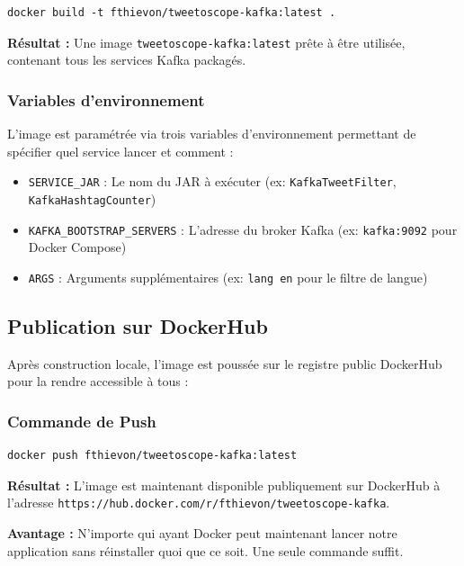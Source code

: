 \documentclass[10pt,a4paper]{article}
\begin{document}
\begin{verbatim}
docker build -t fthievon/tweetoscope-kafka:latest .
\end{verbatim}

\textbf{Résultat :} Une image \texttt{tweetoscope-kafka:latest} prête à être utilisée, contenant tous les services Kafka packagés.

\subsubsection{Variables d'environnement}

L'image est paramétrée via trois variables d'environnement permettant de spécifier quel service lancer et comment :

\begin{itemize}
    \item \texttt{SERVICE\_JAR} : Le nom du JAR à exécuter (ex: \texttt{KafkaTweetFilter}, \texttt{KafkaHashtagCounter})
    \item \texttt{KAFKA\_BOOTSTRAP\_SERVERS} : L'adresse du broker Kafka (ex: \texttt{kafka:9092} pour Docker Compose)
    \item \texttt{ARGS} : Arguments supplémentaires (ex: \texttt{lang en} pour le filtre de langue)
\end{itemize}

\subsection{Publication sur DockerHub}

Après construction locale, l'image est poussée sur le registre public DockerHub pour la rendre accessible à tous :

\subsubsection{Commande de Push}

\begin{verbatim}
docker push fthievon/tweetoscope-kafka:latest
\end{verbatim}

\textbf{Résultat :} L'image est maintenant disponible publiquement sur DockerHub à l'adresse \texttt{https://hub.docker.com/r/fthievon/tweetoscope-kafka}.

\textbf{Avantage :} N'importe qui ayant Docker peut maintenant lancer notre application sans réinstaller quoi que ce soit. Une seule commande suffit.
\end{document}
